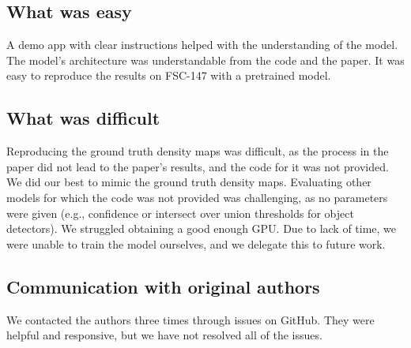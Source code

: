 \subsection{What was easy}
A demo app with clear instructions helped with the understanding of the model. The model's architecture was understandable from the code and the paper. It was easy to reproduce the results on FSC-147 with a pretrained model.

\subsection{What was difficult}
Reproducing the ground truth density maps was difficult, as the process in the paper did not lead to the paper's results, and the code for it was not provided. We did our best to mimic the ground truth density maps. Evaluating other models for which the code was not provided was challenging, as no parameters were given (e.g., confidence or intersect over union thresholds for object detectors). We struggled obtaining a good enough GPU. Due to lack of time, we were unable to train the model ourselves, and we delegate this to future work.

\subsection{Communication with original authors}
We contacted the authors three times through issues on GitHub. They were helpful and responsive, but we have not resolved all of the issues.
